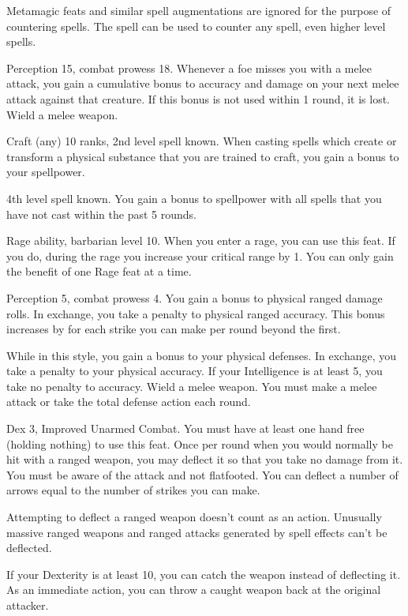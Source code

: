 Metamagic feats and similar spell augmentations are ignored for the purpose of countering spells.
The  spell can be used to counter any spell, even higher level spells.

\featpres Perception 15, combat prowess 18.
\featben Whenever a foe misses you with a melee attack, you gain a cumulative  bonus to accuracy and damage on your next melee attack against that creature.
If this bonus is not used within 1 round, it is lost.
\stylereq Wield a melee weapon.

\featpres Craft (any) 10 ranks, 2nd level spell known.
\featben When casting spells which create or transform a physical substance that you are trained to craft, you gain a  bonus to your spellpower.

\featpre 4th level spell known.
\featben You gain a  bonus to spellpower with all spells that you have not cast within the past 5 rounds.

\featpre Rage ability, barbarian level 10.
\featben When you enter a rage, you can use this feat. If you do, during the rage you increase your critical range by 1.
 You can only gain the benefit of one Rage feat at a time.

\featpres Perception 5, combat prowess 4.
\featben You gain a  bonus to physical ranged damage rolls.
In exchange, you take a  penalty to physical ranged accuracy.
This bonus increases by  for each strike you can make per round beyond the first.

\featben While in this style, you gain a  bonus to your physical defenses.
In exchange, you take a  penalty to your physical accuracy.
If your Intelligence is at least 5, you take no penalty to accuracy.
\stylereq Wield a melee weapon. You must make a melee attack or take the total defense action each round.

\featpres Dex 3, Improved Unarmed Combat.
\featben You must have at least one hand free (holding nothing) to use this feat.
Once per round when you would normally be hit with a ranged weapon, you may deflect it so that you take no damage from it.
You must be aware of the attack and not flatfooted.
You can deflect a number of arrows equal to the number of strikes you can make.
\par Attempting to deflect a ranged weapon doesn't count as an action.
Unusually massive ranged weapons and ranged attacks generated by spell effects can't be deflected.
\par If your Dexterity is at least 10, you can catch the weapon instead of deflecting it.
As an immediate action, you can throw a caught weapon back at the original attacker.

